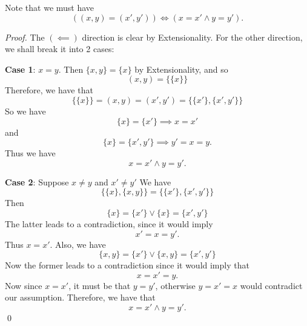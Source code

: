 \documentclass[notoc,notitlepage]{tufte-book}
\begin{document}
\begin{note}
  Note that we must have
  \begin{equation*}
    ( (x, y) = (x', y') ) \iff ( x = x' \land y = y' ).
  \end{equation*}

  \begin{proof}
    The $(\impliedby)$ direction is clear by Extensionality. For the other direction, we shall break it into 2 cases:

    \noindent\textbf{Case 1}: $x = y$. Then $\{x, y\} = \{x\}$ by Extensionality, and so
    \begin{equation*}
      (x, y) = \{ \{ x \} \}
    \end{equation*}
    Therefore, we have that
    \begin{equation*}
      \{ \{ x \} \} = (x, y) = (x', y') = \{ \{ x' \}, \{ x', y' \} \}
    \end{equation*}
    So we have
    \begin{equation*}
      \{ x \} = \{ x' \} \implies x = x'
    \end{equation*}
    and
    \begin{equation*}
      \{ x \} = \{ x', y' \} \implies y' = x = y.
    \end{equation*}
    Thus we have
    \begin{equation*}
      x = x' \land y = y'.
    \end{equation*}

    \noindent \textbf{Case 2}: Suppose $x \neq y$ and $x' \neq y'$  We have
    \begin{equation*}
      \{ \{ x \}, \{ x, y \} \} = \{ \{ x' \}, \{ x', y' \} \}
    \end{equation*}
    Then
    \begin{equation*}
      \{ x \} = \{ x' \} \lor \{ x \} = \{ x', y' \}
    \end{equation*}
    The latter leads to a contradiction, since it would imply
    \begin{equation*}
      x' = x = y'.
    \end{equation*}
    Thus $x = x'$. Also, we have
    \begin{equation*}
      \{ x, y \} = \{ x' \} \lor \{ x, y \} = \{ x', y' \}
    \end{equation*}
    Now the former leads to a contradiction since it would imply that
    \begin{equation*}
      x = x' = y.
    \end{equation*}
    Now since $x = x'$, it must be that $y = y'$, otherwise $y = x' = x$ would contradict our assumption. Therefore, we have that
    \begin{equation*}
      x = x' \land y = y'.
    \end{equation*}\qed
  \end{proof}
\end{note}
\end{document}
